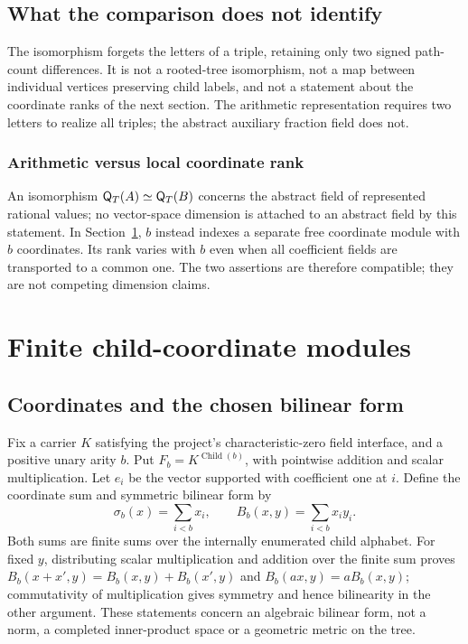 \documentclass[11pt,reqno]{amsart}
\theoremstyle{definition}\newtheorem{definition}[theorem]{Definition}
\theoremstyle{remark}\newtheorem{remark}[theorem]{Remark}
\newcommand{\Fin}{\operatorname{Child}}
\begin{document}
\subsection{What the comparison does not identify}\label{main:sub-21}
The isomorphism forgets the letters of a triple, retaining only two signed path-count differences. It is not a rooted-tree isomorphism, not a map between individual vertices preserving child labels, and not a statement about the coordinate ranks of the next section. The arithmetic representation requires two letters to realize all triples; the abstract auxiliary fraction field does not.


\medskip
\subsubsection*{Arithmetic versus local coordinate rank}\label{supp:7-3}
An isomorphism $\mathsf Q_T(A)\simeq\mathsf Q_T(B)$ concerns the abstract field of represented rational values; no vector-space dimension is attached to an abstract field by this statement. In Section~\ref{sec:finite}, $b$ instead indexes a separate free coordinate module with $b$ coordinates. Its rank varies with $b$ even when all coefficient fields are transported to a common one. The two assertions are therefore compatible; they are not competing dimension claims.
\medskip

\clearpage
\section{Finite child-coordinate modules}\label{sec:finite}
\subsection{Coordinates and the chosen bilinear form}\label{main:sub-22}
Fix a carrier $K$ satisfying the project's characteristic-zero field interface, and a positive unary arity $b$. Put $F_b=K^{\Fin(b)}$, with pointwise addition and scalar multiplication. Let $e_i$ be the vector supported with coefficient one at $i$. Define the coordinate sum and symmetric bilinear form by
\[
\sigma_b(x)=\sum_{i<b}x_i,\qquad B_b(x,y)=\sum_{i<b}x_iy_i.
\]
Both sums are finite sums over the internally enumerated child alphabet. For fixed $y$, distributing scalar multiplication and addition over the finite sum proves $B_b(x+x',y)=B_b(x,y)+B_b(x',y)$ and $B_b(ax,y)=aB_b(x,y)$; commutativity of multiplication gives symmetry and hence bilinearity in the other argument. These statements concern an algebraic bilinear form, not a norm, a completed inner-product space or a geometric metric on the tree.
\end{document}
